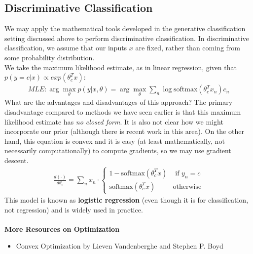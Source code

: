 \documentclass{article}
\begin{document}
\subsection{Discriminative Classification}
We may apply the mathematical tools developed in the generative classification setting discussed above to perform discriminative classification. In discriminative classification, we assume that our inputs $x$ are fixed, rather than coming from some probability distribution.  \\
We take the maximum likelihood estimate, as in linear regression, given that $p(y = c | x) \propto exp(\theta_c^T x)$: 
\begin{align} 
    MLE: \arg\!\max_{\theta} p(y | x, \theta) = \arg\!\max_{\theta} \sum_n \log \text{softmax} (\theta_c^T x_n) c_n
\end{align}
What are the advantages and disadvantages of this approach? The primary disadvantage compared to methods we have seen earlier is that this maximum likelihood estimate has \textit{no closed form}. It is also not clear how we might incorporate our prior (although there is recent work in this area). On the other hand, this equation is convex and it is easy (at least mathematically, not necessarily computationally) to compute gradients, so we may use gradient descent. 
\begin{align} 
    \frac{d (\cdot)}{d \theta_c} = \sum_n x_n \cdot \begin{cases} 1 - \text{softmax}(\theta_c ^T x) & \text{ if } y_n = c \\ \text{softmax}(\theta_c ^T x) & \text{otherwise} \end{cases} 
\end{align}
This model is known as \textbf{logistic regression} (even though it is for classification, not regression) and is widely used in practice.  \\ \\
\textbf{More Resources on Optimization}
\begin{itemize}
    \item Convex Optimization by Lieven Vandenberghe and Stephen P. Boyd
\end{itemize}
\end{document}
